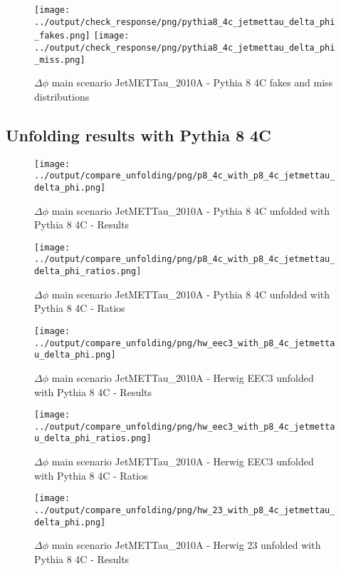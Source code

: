 \documentclass[11pt]{book}
\begin{document}
\begin{figure}[ht]
\centering
\texttt{[image: ../output/check\_response/png/pythia8\_4c\_jetmettau\_delta\_phi\_fakes.png]}
\texttt{[image: ../output/check\_response/png/pythia8\_4c\_jetmettau\_delta\_phi\_miss.png]}
\caption{$\Delta\phi$ main scenario JetMETTau\_2010A - Pythia 8 4C fakes and miss distributions}
\label{p8_jetmettau_delta_phi_fakesmiss}
\end{figure}

\clearpage
\subsection{Unfolding results with Pythia 8 4C}

\begin{figure}[ht]
\centering
\texttt{[image: ../output/compare\_unfolding/png/p8\_4c\_with\_p8\_4c\_jetmettau\_delta\_phi.png]}
\caption{$\Delta\phi$ main scenario JetMETTau\_2010A - Pythia 8 4C unfolded with Pythia 8 4C - Results}
\label{p8_p8_jetmettau_delta_phi_a}
\end{figure}

\begin{figure}[ht]
\centering
\texttt{[image: ../output/compare\_unfolding/png/p8\_4c\_with\_p8\_4c\_jetmettau\_delta\_phi\_ratios.png]}
\caption{$\Delta\phi$ main scenario JetMETTau\_2010A - Pythia 8 4C unfolded with Pythia 8 4C - Ratios}
\label{p8_p8_jetmettau_delta_phi_b}
\end{figure}


\begin{figure}[ht]
\centering
\texttt{[image: ../output/compare\_unfolding/png/hw\_eec3\_with\_p8\_4c\_jetmettau\_delta\_phi.png]}
\caption{$\Delta\phi$ main scenario JetMETTau\_2010A - Herwig EEC3 unfolded with Pythia 8 4C - Results}
\label{hw_eec3_p8_jetmettau_delta_phi_a}
\end{figure}

\begin{figure}[ht]
\centering
\texttt{[image: ../output/compare\_unfolding/png/hw\_eec3\_with\_p8\_4c\_jetmettau\_delta\_phi\_ratios.png]}
\caption{$\Delta\phi$ main scenario JetMETTau\_2010A - Herwig EEC3 unfolded with Pythia 8 4C - Ratios}
\label{hw_eec3_p8_jetmettau_delta_phi_b}
\end{figure}

\begin{figure}[ht]
\centering
\texttt{[image: ../output/compare\_unfolding/png/hw\_23\_with\_p8\_4c\_jetmettau\_delta\_phi.png]}
\caption{$\Delta\phi$ main scenario JetMETTau\_2010A - Herwig 23 unfolded with Pythia 8 4C - Results}
\label{hw_23_p8_jetmettau_delta_phi_a}
\end{figure}
\end{document}
